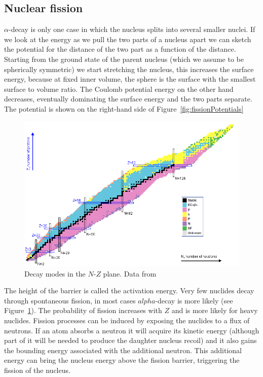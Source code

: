 \documentclass[12pt]{article}
\begin{document}
\subsection{Nuclear fission}
%
%
%
$\alpha$-decay is only one case in which the nucleus splits into several smaller nuclei. If we look at the energy as we pull the two parts of a nucleus apart we can sketch the potential for the distance of the two part as a function of the distance. Starting from the ground state of the parent nucleus (which we assume to be spherically symmetric) we start stretching the nucleus, this increases the surface energy, because at fixed inner volume, the sphere is the surface with the smallest surface to volume ratio. The Coulomb potential energy on the other hand decreases, eventually dominating the surface energy and the two parts separate. The potential is shown on the right-hand side of Figure~\ref{fig:fissionPotentials}
\begin{figure}
\begin{center}
\includegraphics[scale=0.35]{images/decayModesWithLegend.png}   
\end{center}
\caption{Decay modes in the $N$-$Z$ plane. Data from \cite{nndc}}\label{fig:decayModes}
\end{figure} 

The height of the barrier is called the activation energy. Very few nuclides decay through spontaneous fission, in most cases $alpha$-decay is more likely (see Figure~\ref{fig:decayModes}). The probability of fission increases with $Z$ and is more likely for heavy nuclides. Fission processes can be induced by exposing the nuclides to a flux of neutrons. If an atom absorbs a neutron it will acquire its kinetic energy (although part of it will be needed to produce the daughter nucleus recoil) and it also gains the bounding energy associated with the additional neutron. This additional energy can bring the nucleus energy above the fission barrier, triggering the fission of the nucleus. 
\end{document}
